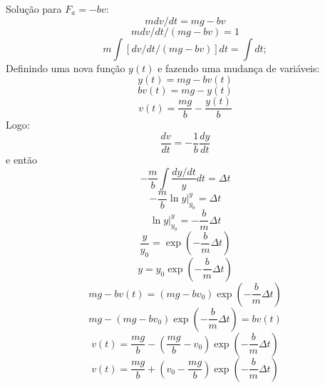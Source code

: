 Solução para $F_a = -bv$:
\begin{equation}
    m dv/dt = mg - b v
\end{equation}
\begin{equation}
    m dv/dt / (mg -bv) = 1
\end{equation}
\begin{equation}
    m\int [dv/dt / (mg - bv)] dt = \int dt ;
\end{equation}
%
Definindo uma nova função $y(t)$ e fazendo uma mudança de variáveis:
\begin{equation}
    y(t) = mg - b v(t) 
\end{equation}
\begin{equation}
    b v(t) = mg - y(t)
\end{equation}
\begin{equation}
    v(t) = \frac{mg}{b} - \frac{y(t)}{b}
\end{equation}
%
Logo:
\begin{equation}
    \frac{dv}{dt} = -\frac{1}{b} \frac{dy}{dt}
\end{equation}
%
e então
\begin{equation}
    -\frac{m}{b} \int \frac{dy/dt}{y} dt = \Delta t
\end{equation}
\begin{equation}
    -\frac{m}{b} \ln y |_{y_0}^y = \Delta t
\end{equation}
\begin{equation}
    \ln y |_{y_0}^y = -\frac{b}{m} \Delta t
\end{equation}
\begin{equation}
    \frac{y}{y_0} = \exp\left(-\frac{b}{m} \Delta t\right)
\end{equation}
\begin{equation}
    y = y_0 \exp\left(-\frac{b}{m} \Delta t\right)
\end{equation}
\begin{equation}
    mg - b v(t) = (mg - b v_0) \exp\left(-\frac{b}{m} \Delta t\right)
\end{equation}
\begin{equation}
    mg - (mg - b v_0) \exp\left(-\frac{b}{m} \Delta t\right) = b v(t)
\end{equation}
\begin{equation}
    v(t) = \frac{mg}{b} - \left(\frac{mg}{b} - v_0\right) \exp\left(-\frac{b}{m} \Delta t\right)
\end{equation}
\begin{equation}
    v(t) = \frac{mg}{b} + \left(v_0 - \frac{mg}{b}\right) \exp \left(-\frac{b}{m} \Delta t\right)
\end{equation}

